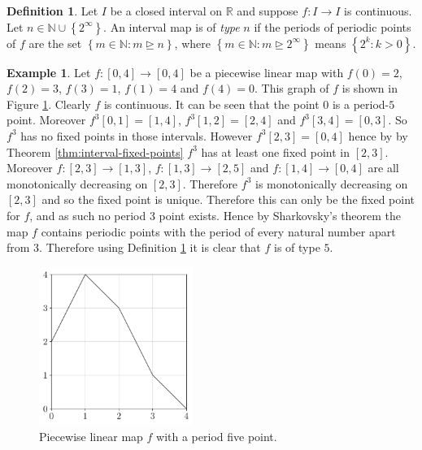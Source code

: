 \documentclass[11pt,a4paper,oneside]{memoir}
\theoremstyle{plain}
\theoremstyle{definition}
\newtheorem{defn}[thm]{Definition}
\newtheorem{exmp}[thm]{Example}
\begin{document}
\begin{defn} \label{def:type}
    Let $I$ be a closed interval on $\mathbb{R}$ and suppose $f: I \to I$ is continuous. Let $n \in \mathbb{N} \cup \left\lbrace 2^{\infty} \right\rbrace$. An interval map is of \emph{type} $n$ if the periods of periodic points of $f$ are the set $\left\lbrace m \in \mathbb{N} : m \unrhd n \right\rbrace$, where $\left\lbrace m \in \mathbb{N} : m \unrhd 2^\infty \right\rbrace$ means $\left\lbrace 2^k : k > 0 \right\rbrace$.
\end{defn}

\begin{exmp} \label{exmp:piecewise_sharkovsky}
    Let $f: [0, 4] \to [0, 4]$ be a piecewise linear map with $f(0) = 2$, $f(2) = 3$, $f(3) = 1$, $f(1) = 4$ and $f(4) = 0$. This graph of $f$ is shown in Figure \ref{fig:piecewise_linear}. Clearly $f$ is continuous. It can be seen that the point 0 is a period-$5$ point. Moreover $f^3[0, 1] = [1, 4]$, $f^3[1, 2] = [2, 4]$ and $f^3[3, 4] = [0, 3]$. So $f^3$ has no fixed points in those intervals. However $f^3[2, 3] = [0, 4]$ hence by by Theorem \ref{thm:interval-fixed-points} $f^3$ has at least one fixed point in $[2, 3]$. Moreover $f: [2, 3] \to [1, 3]$, $f: [1, 3] \to [2, 5]$ and $f: [1, 4] \to [0, 4]$ are all monotonically decreasing on $[2, 3]$. Therefore $f^3$ is monotonically decreasing on $[2, 3]$ and so the fixed point is unique. Therefore this can only be the fixed point for $f$, and as such no period 3 point exists. Hence by Sharkovsky's theorem the map $f$ contains periodic points with the period of every natural number apart from 3. Therefore using Definition \ref{def:type} it is clear that $f$ is of type $5$.

    \begin{figure}[h]
        \centering
        \includegraphics[width=5cm]{piecewise_0_4}
        \caption{Piecewise linear map $f$ with a period five point.}
        \label{fig:piecewise_linear}
    \end{figure}

\end{exmp}
\end{document}
